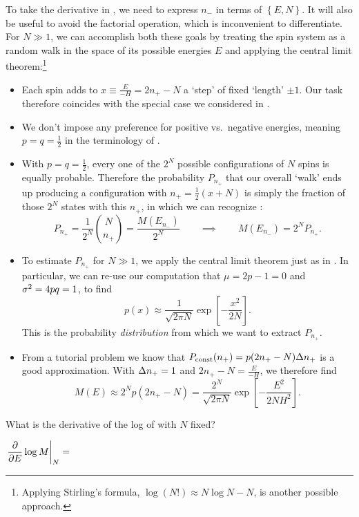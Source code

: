 To take the derivative in , we need to express $n_-$ in terms of $\left\{E, N\right\}$.
It will also be useful to avoid the factorial operation, which is inconvenient to differentiate.
For $N \gg 1$, we can accomplish both these goals by treating the spin system as a random walk in the space of its possible energies $E$ and applying the central limit theorem:\footnote{Applying Stirling's formula, $\log(N!) \approx N \log N - N$, is another possible approach.} \\[-24 pt]
\begin{itemize} %
  \item Each spin adds to $x \equiv \frac{E}{-H} = 2n_+ - N$ a `step' of fixed `length' $\pm 1$.
        Our task therefore coincides with the special case we considered in .
  \item We don't impose any preference for positive vs.\ negative energies, meaning $p = q = \frac{1}{2}$ in the terminology of .
  \item With $p = q = \frac{1}{2}$, every one of the $2^N$ possible configurations of $N$ spins is equally probable.
        Therefore the probability $P_{n_+}$ that our overall `walk' ends up producing a configuration with $n_+ = \frac{1}{2}\left(x + N\right)$ is simply the fraction of those $2^N$ states with this $n_+$, in which we can recognize :
        \begin{equation*}
          P_{n_+} = \frac{1}{2^N} \binom{N}{n_+} = \frac{M(E_{n_-})}{2^N} \qquad \implies \qquad M(E_{n_-}) = 2^N P_{n_+}.
        \end{equation*}
  \item To estimate $P_{n_+}$ for $N \gg 1$, we apply the central limit theorem just as in .
        In particular, we can re-use our computation that $\mu = 2p - 1 = 0$ and $\sigma^2 = 4pq = 1$, to find
        \begin{equation*}
          p(x) \approx \frac{1}{\sqrt{2\pi N}}\exp\left[-\frac{x^2}{2N}\right].
        \end{equation*}
        This is the probability \textit{distribution} from which we want to extract $P_{n_+}$.
  \item From a tutorial problem we know that $P_{\text{const}}(n_+) = p(2n_+ - N) \Delta n_+$ is a good approximation.
        With $\Delta n_+ = 1$ and $2n_+ - N = \frac{E}{-H}$, we therefore find
        \begin{equation}
          \label{eq:CLT_states}
          M(E) \approx 2^N p(2n_+ - N) = \frac{2^N}{\sqrt{2\pi N}}\exp\left[-\frac{E^2}{2NH^2}\right].
        \end{equation}
\end{itemize}
What is the derivative of the log of  with $N$ fixed?
\begin{mdframed}
  $\displaystyle \left.\frac{\partial }{\partial E} \log M\right|_N = $ \\[100 pt]
\end{mdframed}

